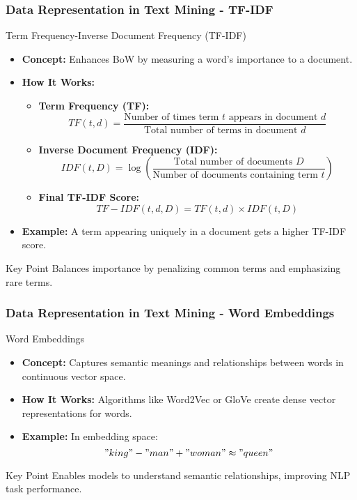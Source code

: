 \documentclass[aspectratio=169]{beamer}
\begin{document}
\begin{frame}[fragile]
    \frametitle{Data Representation in Text Mining - TF-IDF}
    \begin{block}{Term Frequency-Inverse Document Frequency (TF-IDF)}
        \begin{itemize}
            \item \textbf{Concept:} Enhances BoW by measuring a word's importance to a document.
            \item \textbf{How It Works:}
            \begin{itemize}
                \item \textbf{Term Frequency (TF):}
                \[
                TF(t, d) = \frac{\text{Number of times term } t \text{ appears in document } d}{\text{Total number of terms in document } d}
                \]
                \item \textbf{Inverse Document Frequency (IDF):}
                \[
                IDF(t, D) = \log\left(\frac{\text{Total number of documents } D}{\text{Number of documents containing term } t}\right)
                \]
                \item \textbf{Final TF-IDF Score:}
                \[
                TF-IDF(t, d, D) = TF(t, d) \times IDF(t, D)
                \]
            \end{itemize}
            \item \textbf{Example:} A term appearing uniquely in a document gets a higher TF-IDF score.
        \end{itemize}
        \begin{block}{Key Point}
            Balances importance by penalizing common terms and emphasizing rare terms.
        \end{block}
    \end{block}
\end{frame}

\begin{frame}[fragile]
    \frametitle{Data Representation in Text Mining - Word Embeddings}
    \begin{block}{Word Embeddings}
        \begin{itemize}
            \item \textbf{Concept:} Captures semantic meanings and relationships between words in continuous vector space.
            \item \textbf{How It Works:} Algorithms like Word2Vec or GloVe create dense vector representations for words.
            \item \textbf{Example:} In embedding space:
            \[
            "king" - "man" + "woman" \approx "queen"
            \]
        \end{itemize}
        \begin{block}{Key Point}
            Enables models to understand semantic relationships, improving NLP task performance.
        \end{block}
    \end{block}
\end{frame}
\end{document}
